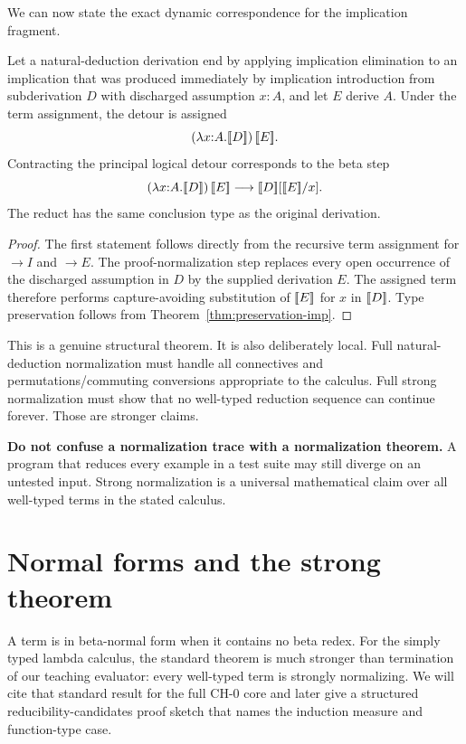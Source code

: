 We can now state the exact dynamic correspondence for the implication fragment.

\begin{proposition}
\label{prop:detour-beta}
Let a natural-deduction derivation end by applying implication elimination to an implication that was produced immediately by implication introduction from subderivation $D$ with discharged assumption $x{:}A$, and let $E$ derive $A$. Under the term assignment, the detour is assigned
\[
 (\lambda x{:}A.\lbrack\!\lbrack D\rbrack\!\rbrack)\,\lbrack\!\lbrack E\rbrack\!\rbrack.
\]
Contracting the principal logical detour corresponds to the beta step
\[
 (\lambda x{:}A.\assign{D})\,\assign{E}
 \step
 \assign{D}[\assign{E}/x].
\]
The reduct has the same conclusion type as the original derivation.
\end{proposition}

\begin{proof}
The first statement follows directly from the recursive term assignment for $\to I$ and $\to E$. The proof-normalization step replaces every open occurrence of the discharged assumption in $D$ by the supplied derivation $E$. The assigned term therefore performs capture-avoiding substitution of $\lbrack\!\lbrack E\rbrack\!\rbrack$ for $x$ in $\lbrack\!\lbrack D\rbrack\!\rbrack$. Type preservation follows from Theorem~\ref{thm:preservation-imp}.
\end{proof}

This is a genuine structural theorem. It is also deliberately local. Full natural-deduction normalization must handle all connectives and permutations/commuting conversions appropriate to the calculus. Full strong normalization must show that no well-typed reduction sequence can continue forever. Those are stronger claims.

\begin{warningbox}
\textbf{Do not confuse a normalization trace with a normalization theorem.} A program that reduces every example in a test suite may still diverge on an untested input. Strong normalization is a universal mathematical claim over all well-typed terms in the stated calculus.
\end{warningbox}

\section{Normal forms and the strong theorem}

A term is in beta-normal form when it contains no beta redex. For the simply typed lambda calculus, the standard theorem is much stronger than termination of our teaching evaluator: every well-typed term is strongly normalizing. We will cite that standard result for the full $\mathrm{CH}\text{-}0$ core and later give a structured reducibility-candidates proof sketch that names the induction measure and function-type case.

